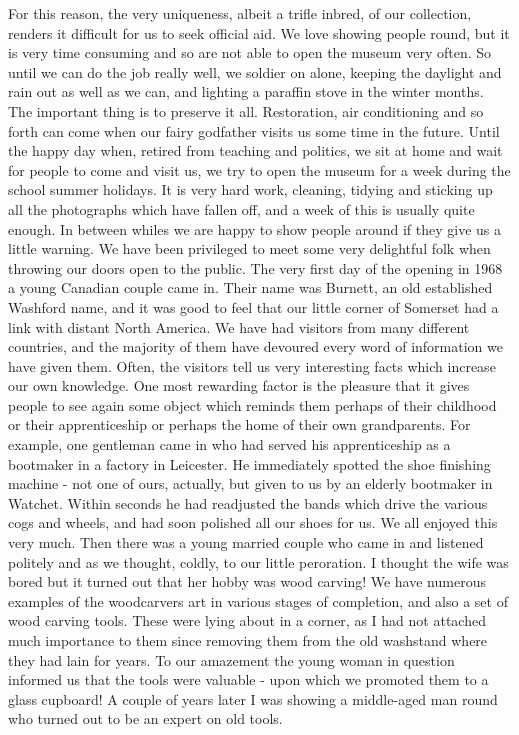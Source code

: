 For this reason, the very uniqueness, albeit a trifle inbred, of our collection, renders it difficult for us to seek official aid. We love showing people round, but it is very time consuming and so are not able to open the museum very often. So until we can do the job really well, we soldier on alone, keeping the daylight and rain out as well as we can, and lighting a paraffin stove in the winter months. The important thing is to preserve it all. Restoration, air conditioning and so forth can come when our fairy godfather visits us some time in the future. Until the happy day when, retired from teaching and politics, we sit at home and wait for people to come and visit us, we try to open the museum for a week during the school summer holidays. It is very hard work, cleaning, tidying and sticking up all the photographs which have fallen off, and a week of this is usually quite enough. In between whiles we are happy to show people around if they give us a little warning. We have been privileged to meet some very delightful folk when throwing our doors open to the public. The very first day of the opening in 1968 a young Canadian couple came in. Their name was Burnett, an old established Washford name, and it was good to feel that our little corner of Somerset had a link with distant North America. We have had visitors from many different countries, and the majority of them have devoured every word of information we have given them. Often, the visitors tell us very interesting facts which increase our own knowledge. One most rewarding factor is the pleasure that it gives people to see again some object which reminds them perhaps of their childhood or their apprenticeship or perhaps the home of their own grandparents. For example, one gentleman came in who had served his apprenticeship as a bootmaker in a factory in Leicester. He immediately spotted the shoe finishing machine - not one of ours, actually, but given to us by an elderly bootmaker in Watchet. Within seconds he had readjusted the bands which drive the various cogs and wheels, and had soon polished all our shoes for us. We all enjoyed this very much. Then there was a young married couple who came in and listened politely and as we thought, coldly, to our little peroration. I thought the wife was bored but it turned out that her hobby was wood carving! We have numerous examples of the woodcarvers art in various stages of completion, and also a set of wood carving tools. These were lying about in a corner, as I had not attached much importance to them since removing them from the old washstand where they had lain for years. To our amazement the young woman in question informed us that the tools were valuable - upon which we promoted them to a glass cupboard! A couple of years later I was showing a middle-aged man round who turned out to be an expert on old tools.

